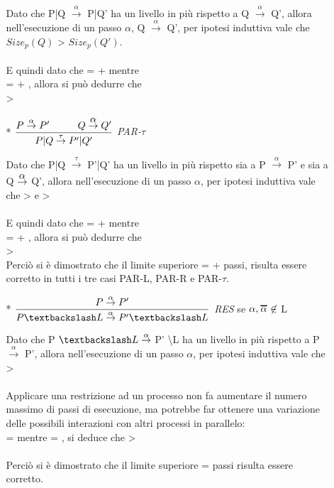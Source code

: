 \begin{itemize}
\begin{itemize}
			Dato che P|Q $\overset{\alpha}\rightarrow$ P|Q' ha un livello in più rispetto a Q $\overset{\alpha}\rightarrow$ Q', allora nell'esecuzione di un passo $\alpha$, Q $\overset{\alpha}\rightarrow$ Q', per ipotesi induttiva vale che $Size_{p}(Q)$ > $Size_{p}(Q')$.\\ \\
			E quindi dato che  =  +  mentre\\  =  + , allora si può dedurre che \\  > 
			\\
		\item[*]
			$\dfrac{P \overset{\alpha}\rightarrow P' \hspace{1cm} Q \overset{\Overline[0.01pt]{\alpha}}\rightarrow Q'}{P|Q \overset{\tau}\rightarrow P'|Q'}$ \textit{PAR-$\tau$}  
		
			Dato che P|Q $\overset{\tau}\rightarrow$ P'|Q' ha un livello in più rispetto sia a P $\overset{\alpha}\rightarrow$ P' e sia a Q $\overset{\Overline[0.01pt]{\alpha}}\rightarrow$ Q', allora nell'esecuzione di un passo $\alpha$, per ipotesi induttiva vale che  >  e  >  \\
			\\
			E quindi dato che  =  +  mentre\\  =  + , allora si può dedurre che \\  > 
			\\
			
		Perciò si è dimostrato che il limite superiore   = +  passi, risulta essere corretto in tutti i tre casi PAR-L, PAR-R e PAR-$\tau$.
		\\
		\item[*]
			$\dfrac{P \overset{\alpha}\rightarrow P'}{P \textbackslash L \overset{\alpha}\rightarrow P' \textbackslash L}$ \textit{RES} se $\alpha, \Overline[1pt]{\alpha} \not\in$ L
			
			Dato che P $\textbackslash L \overset{\alpha}\rightarrow $ P' \textbackslash L ha un livello in più rispetto a P $\overset{\alpha}\rightarrow$ P', allora nell'esecuzione di un passo $\alpha$, per ipotesi induttiva vale che  >   \\
			\\
			Applicare una restrizione ad un processo non fa aumentare il numero massimo di passi di esecuzione, ma potrebbe far ottenere una variazione delle possibili interazioni con altri processi in parallelo:\\  =  mentre  = , si deduce che  > \\
			\\
		Perciò si è dimostrato che il limite superiore  =  passi risulta essere corretto.
		\\
			

\end{itemize}
\end{itemize}
